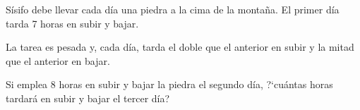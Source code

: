 \begin{enumerate}
\begin{multicols}{2}
Sísifo debe llevar cada día una piedra a la cima de la montaña. El primer día tarda 7 horas en subir y bajar.

\vspace{2mm} La tarea es pesada y, cada día, tarda el doble que el anterior en subir y la mitad que el anterior en bajar.

\vspace{2mm} Si emplea 8 horas en subir y bajar la piedra el segundo día, ?`cuántas horas tardará en subir y bajar el tercer día?	
	\end{multicols}


\vspace{-6mm}
\begin{flushright}
\begin{footnotesize} \textcolor{gris}{}	\end{footnotesize}
\end{flushright}



\end{enumerate}

